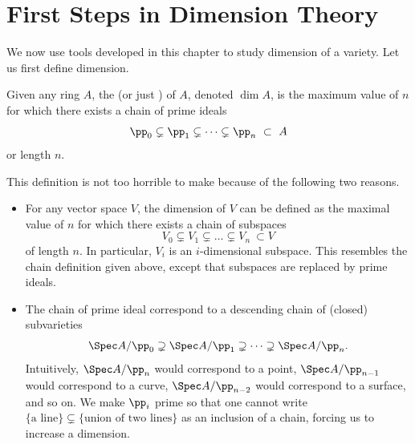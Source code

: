 \section{First Steps in Dimension Theory}
\label{sec:dim_intro}
We now use tools developed in this chapter
to study dimension of a variety.
Let us first define dimension.
\begin{definition}
    Given any ring $A$, the 
    (or just )
    of $A$, denoted $\dim A$,
    is the maximum value of $n$ for which
    there exists a chain of prime ideals
    $$\pp_0\subsetneq \pp_1 \subsetneq \dots 
    \subsetneq \pp_n\ \subset \ A$$
    or length $n$.
\end{definition}
This definition is not too horrible to make because
of the following two reasons.
\begin{itemize}
    \item For any vector space $V$, 
    the dimension of $V$ can be defined as the maximal
    value of $n$ for which there exists a chain of subspaces
    $$V_0\subsetneq V_1\subsetneq \dots\subsetneq V_n 
    \ \subset V$$
    of length $n$. 
    In particular, $V_i$ is an $i$-dimensional subspace.
    This resembles the chain definition given above,
    except that subspaces are replaced by prime ideals.
    \item The chain of prime ideal correspond to 
    a descending chain of (closed) subvarieties
    $$\Spec A/\pp_0 \supsetneq \Spec A/\pp_1 \supsetneq \dots \supsetneq 
    \Spec A/\pp_n.$$
    Intuitively, $\Spec A/\pp_n$ would correspond to a point,
    $\Spec A/\pp_{n-1}$ would correspond to a curve,
    $\Spec A/\pp_{n-2}$ would correspond to a surface, and so on.
    We make $\pp_i$ prime so that one cannot write 
    $\{\text{a line}\} \subsetneq \{\text{union of two lines}\}$
    as an inclusion of a chain, forcing us to increase a dimension.
\end{itemize}
